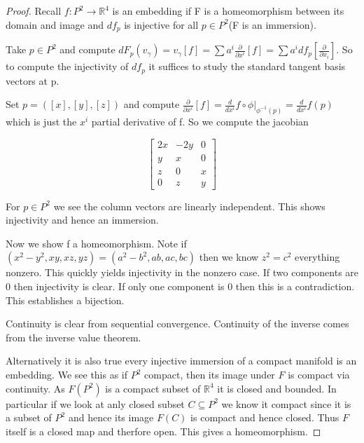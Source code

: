 \documentclass[11pt]{article}
\newcommand{\R}{\mathbb{R}}
\newcommand{\pa}{\partial}
\begin{document}
\begin{proof}
	Recall $f : P^2 \to \R^4$ is an embedding if F is a homeomorphism between its domain and image and $df_p$ is injective for all $p \in P^2$(F is an immersion).

	Take $p \in P^2$ and compute $dF_p(v_{\gamma}) = v_{\gamma}[f] = \sum a^i \frac{\pa}{\pa x^i}[f] = \sum a^i df_p[\frac{\pa}{\pa x_i}]$. So to compute the injectivity of $df_p$ it suffices to study the standard tangent basis vectors at p. 

	Set $p = ([x],[y],[z])$ and compute $\frac{\pa}{\pa x^i}[f] = \frac{d}{dx^i} f \circ \phi|_{\phi^{-1}(p)} = \frac{d}{dx^i} f(p)$ which is just the $x^i$ partial derivative of f. So we compute the jacobian

	\[
	\begin{bmatrix}
		2x & -2y & 0 \\
		y & x & 0 \\
		z & 0 & x \\
		0 & z & y
	\end{bmatrix}
	\]

	For $p \in P^2$ we see the column vectors are linearly independent.  This shows injectivity and hence an immersion.

	Now we show f a homeomorphism. Note if $(x^2-y^2,xy,xz,yz) = (a^2-b^2,ab,ac,bc)$ then we know $z^2 = c^2$ everything nonzero. This quickly yields injectivity in the nonzero case. If two components are 0 then injectivity is clear. If only one component is 0 then this is a contradiction. This establishes a bijection. 

	Continuity is clear from sequential convergence. Continuity of the inverse comes from the inverse value theorem.

	Alternatively it is also true every injective immersion of a compact manifold is an embedding. We see this as if $P^2$ compact, then its image under $F$ is compact via continuity. As $F(P^2)$ is a compact subset of $\R^4$ it is closed and bounded. In particular if we look at anly closed subset $C \subseteq P^2$ we know it compact since it is a subset of $P^2$ and hence its image $F(C)$ is compact and hence closed. Thus $F$ itself is a closed map and therfore open. This gives a homeomorphism. 


\end{proof}
\end{document}
